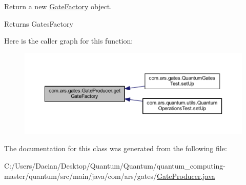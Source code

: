Return a new {\ttfamily \hyperlink{classcom_1_1ars_1_1gates_1_1_gate_factory}{Gate\+Factory}} object. \begin{DoxyReturn}{Returns}
Gates\+Factory 
\end{DoxyReturn}
Here is the caller graph for this function\+:\nopagebreak
\begin{figure}[H]
\begin{center}
\leavevmode
\includegraphics[width=350pt]{classcom_1_1ars_1_1gates_1_1_gate_producer_a643829e30db1500430781afb9bc825e9_icgraph}
\end{center}
\end{figure}


The documentation for this class was generated from the following file\+:\begin{DoxyCompactItemize}
\item 
C\+:/\+Users/\+Dacian/\+Desktop/\+Quantum/\+Quantum/quantum\+\_\+computing-\/master/quantum/src/main/java/com/ars/gates/\hyperlink{_gate_producer_8java}{Gate\+Producer.\+java}\end{DoxyCompactItemize}
